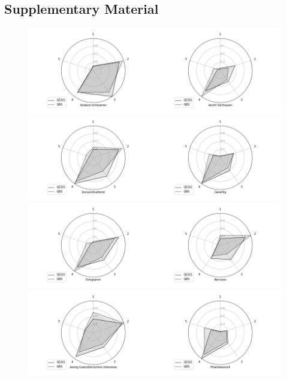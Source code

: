 
\begin{appendices}


\chapter{Supplementary Material}

\begin{figure}[ht]
	\begin{center}
\includegraphics[scale=0.42,angle=0]{fig/Agreeablenessfigure} \\
\includegraphics[scale=0.31,angle=0]{fig/Extraversionfigure} \\
\includegraphics[scale=0.31,angle=0]{fig/Neuroticismfigure} \\
\includegraphics[scale=0.31,angle=0]{fig/Opennessfigure} \\

\end{center}
\end{figure}
\end{appendices}
